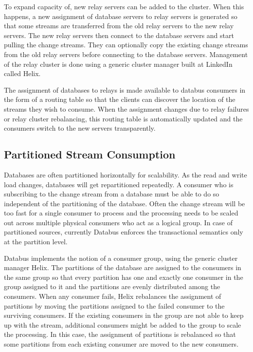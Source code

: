 To expand capacity of, new relay servers can be added to the cluster. When this happens, a new assignment of database servers to relay servers is generated so that some streams are transferred from the old relay servers to the new relay servers. The new relay servers then connect to the database servers and start pulling the change streams. They can optionally copy the existing change streams from the old relay servers before connecting to the database servers. Management of the relay cluster is done using a generic cluster manager built at LinkedIn called Helix.

The assignment of databases to relays is made available to databus consumers in the form of a routing table so that the clients can discover the location of the streams they wish to consume. When the assignment changes due to relay failures or relay cluster rebalancing, this routing table is automatically updated and the consumers switch to the new servers transparently.

\subsection{Partitioned Stream Consumption}

Databases are often partitioned horizontally for scalability. As the read and write load changes, databases will get repartitioned repeatedly. A consumer who is subscribing to the change stream from a database must be able to do so independent of the partitioning of the database. Often the change stream will be too fast for a single consumer to process and the processing needs to be scaled out across multiple physical consumers who act as a logical group. In case of partitioned sources,  currently Databus enforces the transactional semantics only at the partition level. 

Databus implements the notion of a consumer group, using the generic cluster manager Helix. The partitions of the database are assigned to the consumers in the same group so that every partition has one and exactly one consumer in the group assigned to it and the partitions are evenly distributed among the consumers. When any consumer fails, Helix rebalances the assignment of partitions by moving the partitions assigned to the failed consumer to the surviving consumers. If the existing consumers in the group are not able to keep up with the stream, additional consumers might be added to the group to scale the processing. In this case, the assignment of partitions is rebalanced so that some partitions from each existing consumer are moved to the new consumers.

